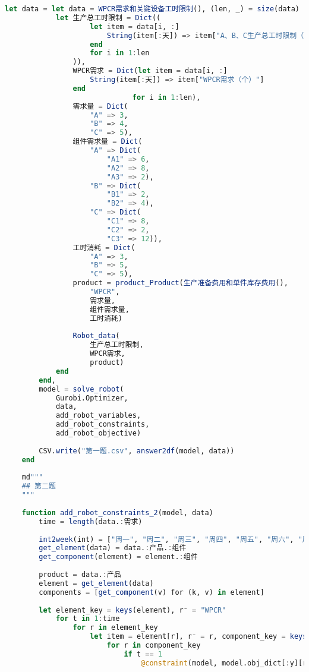 \begin{appendices}
\begin{lstlisting}[language=julia]
    let data = let data = WPCR需求和关键设备工时限制(), (len, _) = size(data)
            let 生产总工时限制 = Dict((
                    let item = data[i, :]
                        String(item[:天]) => item["A、B、C生产总工时限制（工时）"]
                    end
                    for i in 1:len
                )),
                WPCR需求 = Dict(let item = data[i, :]
                    String(item[:天]) => item["WPCR需求（个）"]
                end
                              for i in 1:len),
                需求量 = Dict(
                    "A" => 3,
                    "B" => 4,
                    "C" => 5),
                组件需求量 = Dict(
                    "A" => Dict(
                        "A1" => 6,
                        "A2" => 8,
                        "A3" => 2),
                    "B" => Dict(
                        "B1" => 2,
                        "B2" => 4),
                    "C" => Dict(
                        "C1" => 8,
                        "C2" => 2,
                        "C3" => 12)),
                工时消耗 = Dict(
                    "A" => 3,
                    "B" => 5,
                    "C" => 5),
                product = product_Product(生产准备费用和单件库存费用(),
                    "WPCR",
                    需求量,
                    组件需求量,
                    工时消耗)
    
                Robot_data(
                    生产总工时限制,
                    WPCR需求,
                    product)
            end
        end,
        model = solve_robot(
            Gurobi.Optimizer,
            data,
            add_robot_variables,
            add_robot_constraints,
            add_robot_objective)
    
        CSV.write("第一题.csv", answer2df(model, data))
    end
    
    md"""
    ## 第二题
    """
    
    function add_robot_constraints_2(model, data)
        time = length(data.:需求)
    
        int2week(int) = ["周一", "周二", "周三", "周四", "周五", "周六", "周日"][int]
        get_element(data) = data.:产品.:组件
        get_component(element) = element.:组件
    
        product = data.:产品
        element = get_element(data)
        components = [get_component(v) for (k, v) in element]
    
        let element_key = keys(element), r⁻ = "WPCR"
            for t in 1:time
                for r in element_key
                    let item = element[r], r⁻ = r, component_key = keys(item.:组件)
                        for r in component_key
                            if t == 1
                                @constraint(model, model.obj_dict[:y][r, t] == 0 + model.obj_dict[:x][r, t] - item.:需求量[r] * model.obj_dict[:x][r⁻, t])
    

\end{lstlisting}
\end{appendices}

